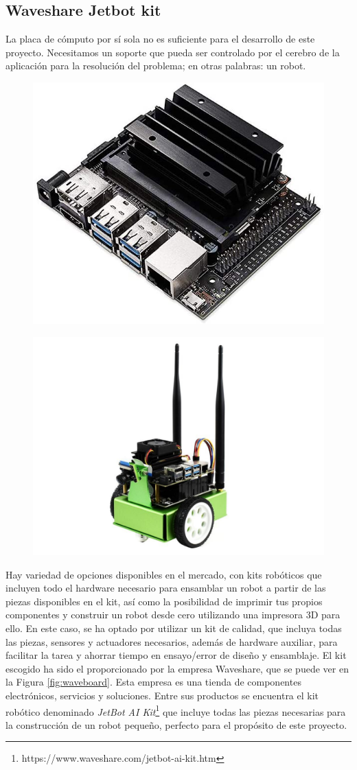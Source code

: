 \subsection{Waveshare Jetbot kit}

La placa de cómputo por sí sola no es suficiente para el desarrollo de este proyecto. Necesitamos un soporte que pueda ser controlado por el cerebro de la aplicación para la resolución del problema; en otras palabras: un robot.


\begin{figure}
\centering
\begin{minipage}{.5\textwidth}
  \centering
  \includegraphics[width=.5\linewidth]{img/nanoboard}
  \label{fig:nanoboard}
\end{minipage}%
\begin{minipage}{.5\textwidth}
  \centering
  \includegraphics[width=.6\linewidth]{img/wavebot}
  \label{fig:wavebot}
\end{minipage}
\end{figure}

Hay variedad de opciones disponibles en el mercado, con kits robóticos que incluyen todo el hardware necesario para ensamblar un robot a partir de las piezas disponibles en el kit, así como la posibilidad de imprimir tus propios componentes y construir un robot desde cero utilizando una impresora 3D para ello. En este caso, se ha optado por utilizar un kit de calidad, que incluya todas las piezas, sensores y actuadores necesarios, además de hardware auxiliar, para facilitar la tarea y ahorrar tiempo en ensayo/error de diseño y ensamblaje. El kit escogido ha sido el proporcionado por la empresa Waveshare, que se puede ver en la Figura \ref{fig:waveboard}. Esta empresa es una tienda de componentes electrónicos, servicios y soluciones. Entre sus productos se encuentra el kit robótico denominado \textit{JetBot AI Kit}\footnote{https://www.waveshare.com/jetbot-ai-kit.htm} que incluye todas las piezas necesarias para la construcción de un robot pequeño, perfecto para el propósito de este proyecto. 

